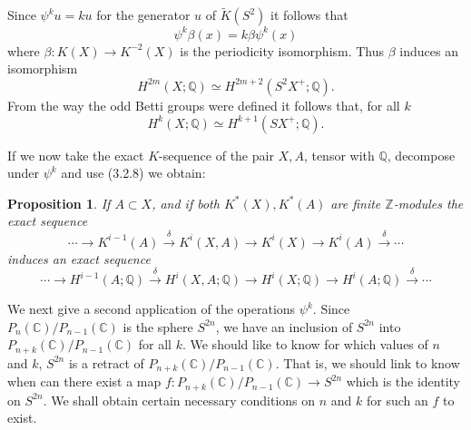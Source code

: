 \documentclass[leqno]{book}
\numberwithin{equation}{section}
\newtheorem{proposition}[theorem]{Proposition}
\theoremstyle{definition}
\begin{document}
            Since $\psi^{k}u=ku$ for the generator $u$ of $\tilde{K}(S^{2})$ it follows that 
            $$\psi^{k}\beta(x)=k \beta \psi^{k}(x)$$
            where $\beta:K(X)\to K^{-2}(X)$ is the periodicity isomorphism. Thus $\beta$ induces an isomorphism
            \begin{equation*}
              H^{2m}(X;\mathbb{Q})\simeq H^{2m+2}(S^{2}X^{+};\mathbb{Q}).
            \end{equation*}
            From the way the odd Betti groups were defined it follows that, for all $k$
            \begin{equation*}
              \tag{3.2.8}
              H^{k}(X;\mathbb{Q})\simeq H^{k+1}(SX^{+};\mathbb{Q}).
            \end{equation*}
            \setcounter{theorem}{8}
            
            If we now take the exact $K$-sequence of the pair $X,A$, tensor with $\mathbb{Q}$, decompose under $\psi^{k}$ and use (3.2.8) we obtain:

            \begin{proposition}
              If $A \subset X$, and if both $K^{*}(X),K^{*}(A)$ are finite $\mathbb{Z}$-modules the exact sequence
              \begin{equation*}
                \cdots\to K^{i-1}(A)\stackrel{\delta}{\rightarrow} K^{i}(X,A)\to K^{i}(X)\to K^{i}(A)\stackrel{\delta}{\rightarrow} \cdots
              \end{equation*}
              induces an exact sequence
              \begin{equation*}
                \cdots\to H^{i-1}(A;\mathbb{Q})\stackrel{\delta}{\rightarrow} H^{i}(X,A;\mathbb{Q})\to H^{i}(X;\mathbb{Q})\to H^{i}(A;\mathbb{Q})\stackrel{\delta}{\rightarrow}\cdots
              \end{equation*}
            \end{proposition}

            We next give a second application of the operations $\psi^{k}$. Since $P_{n}(\mathbb{C})/P_{n-1}(\mathbb{C})$ is the sphere $S^{2n}$, we have an inclusion of $S^{2n}$ into $P_{n+k}(\mathbb{C})/P_{n-1}(\mathbb{C})$ for all $k$. We should like to know for which values of $n$ and $k$, $S^{2n}$ is a retract of $P_{n+k}(\mathbb{C})/P_{n-1}(\mathbb{C})$. That is, we should link to know when can there exist a map $f:P_{n+k}(\mathbb{C})/P_{n-1}(\mathbb{C})\to S^{2n}$ which is the identity on $S^{2n}$. We shall obtain certain necessary conditions on $n$ and $k$ for such an $f$ to exist.
\end{document}
